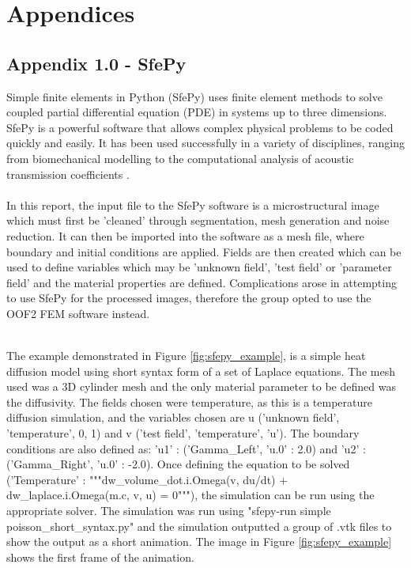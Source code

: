 \documentclass[\report.tex]{subfiles}
\begin{document}
\section{Appendices}

\subsection{Appendix 1.0 - SfePy}
Simple finite elements in Python (SfePy) uses finite element methods to solve coupled partial differential equation (PDE) in systems up to three dimensions. SfePy is a powerful software that allows complex physical problems to be coded quickly and easily. It has been used successfully in a variety of disciplines, ranging from biomechanical modelling \cite{biomedapplication} to the computational analysis of acoustic transmission coefficients \cite{AcousticTransmission}.\\ \\In this report, the input file to the SfePy software is a microstructural image which must first be 'cleaned' through segmentation, mesh generation and noise reduction. It can then be imported into the software as a mesh file, where boundary and initial conditions are applied. Fields are then created which can be used to define variables which may be 'unknown field', 'test field' or 'parameter field' \cite{FEMinSfePy} and the material properties are defined. Complications arose in attempting to use SfePy for the processed images, therefore the group opted to use the OOF2 FEM software instead.

\\The example demonstrated in Figure \ref{fig:sfepy_example}, is a simple heat diffusion model using short syntax form of a set of Laplace equations. The mesh used was a 3D cylinder mesh and the only material parameter to be defined was the diffusivity. The fields chosen were temperature, as this is a temperature diffusion simulation, and the variables chosen are u ('unknown field', 'temperature', 0, 1) and v ('test field',    'temperature', 'u'). The boundary conditions are also defined as: 'u1' : ('Gamma\_Left', {'u.0' : 2.0}) and 'u2' : ('Gamma\_Right', {'u.0' : -2.0}). Once defining the equation to be solved ('Temperature' : """dw\_volume\_dot.i.Omega(v, du/dt) + dw\_laplace.i.Omega(m.c, v, u) = 0"""), the simulation can be run using the appropriate solver. The simulation was run using "sfepy-run simple poisson\_short\_syntax.py" and the simulation outputted a group of .vtk files to show the output as a short animation. The image in Figure \ref{fig:sfepy_example} shows the first frame of the animation.
\end{document}
